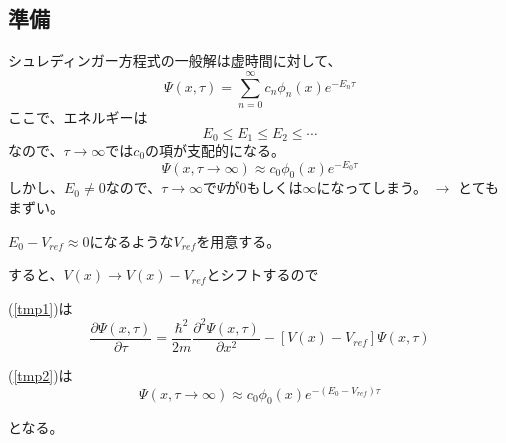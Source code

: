 \documentclass[dvipdfmx]{beamer}
\begin{document}
    \subsection{準備}
    \begin{frame}{\insertsubsection}
      シュレディンガー方程式の一般解は虚時間に対して、
      \begin{equation}
        \Psi(x,\tau) = \sum_{n=0}^\infty c_n \phi_n(x) e^{-E_n\tau}
      \end{equation}
      ここで、エネルギーは
      \begin{equation}
        E_0 \leq E_1 \leq E_2 \leq \cdots
      \end{equation}
      なので、$\tau \to \infty$では$c_0$の項が支配的になる。
      \begin{equation}
        \label{tmp2}
        \Psi(x,\tau\to\infty) \approx c_0 \phi_0(x) e^{-E_0\tau}
      \end{equation}
      しかし、$E_0 \neq 0$なので、$\tau\to\infty$で$\Psi$が$0$もしくは$\infty$になってしまう。
      $\to$ とてもまずい。
    \end{frame}


    \begin{frame}
        $E_0 - V_{ref} \approx 0$になるような$V_{ref}$を用意する。

        すると、$V(x) \to V(x)-V_{ref}$とシフトするので

        (\ref{tmp1})は
        \begin{equation}
          \label{tmp3}
          \dfrac{\partial \Psi(x,\tau)}{\partial \tau} = \dfrac{\hbar^2}{2m}\dfrac{\partial^2 \Psi(x,\tau)}{\partial x^2} - [V(x)-V_{ref}]\Psi(x,\tau)
        \end{equation}

        (\ref{tmp2})は
        \begin{equation}
          \label{tmp4}
          \Psi(x,\tau\to\infty) \approx c_0 \phi_0(x) e^{-(E_0-V_{ref})\tau}
        \end{equation}

        となる。

    \end{frame}
\end{document}
